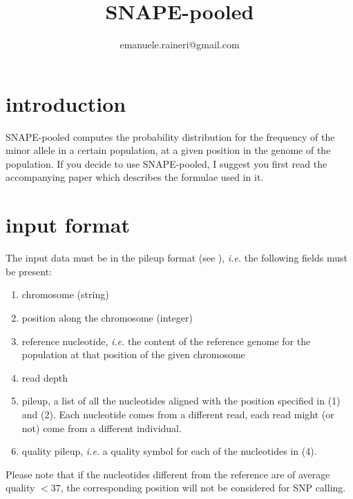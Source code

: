 \documentclass{report}
\newcommand{\tmem}[1]{{\em #1\/}}
\newenvironment{enumeratenumeric}{\begin{enumerate}[1.] }{\end{enumerate}}
\begin{document}
\title{SNAPE-pooled}\author{emanuele.raineri@gmail.com}
\maketitle

\section{introduction}

SNAPE-pooled computes the probability distribution for the frequency of the
minor allele in a certain population, at a given position in the genome of
the population. If you decide to use SNAPE-pooled, I suggest you first read the
accompanying paper which describes the formulae used in it.

\section{input format}

The input data must be in the pileup format 
(see {\color{blue}{http://samtools.sourceforge.net/pileup.shtml}}),
{\tmem{i.e.}} the following fields must be present:


\begin{enumeratenumeric}
  \item chromosome (string) 
  
  \item position along the chromosome (integer)
  
  \item reference nucleotide, {\tmem{i.e.}} the content of the reference
  genome for the population at that position of the given chromosome
  
  \item read depth
  
  \item pileup, a list of all the nucleotides aligned with the position
  specified in (1) and (2). Each nucleotide comes from a different read, each
  read might (or not) come from a different individual.
  
  \item quality pileup, {\tmem{i.e.}}  a quality symbol for each of the
  nucleotides in (4).
  
  
\end{enumeratenumeric}


Please note that if the nucleotides different from the reference are of average quality $<37$,
the corresponding position will not be considered for SNP calling.
\end{document}
